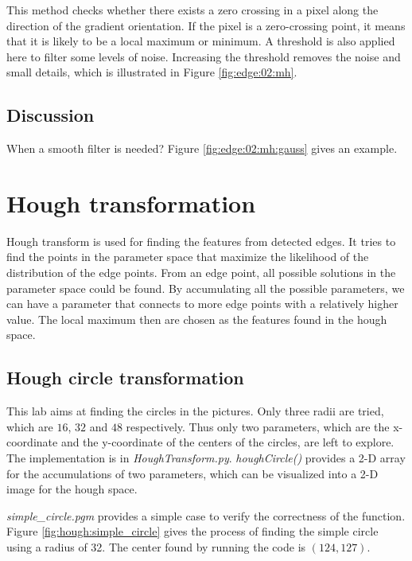 \documentclass[paper=a4, fontsize=11pt]{scrartcl}
\numberwithin{equation}{section}		%
\numberwithin{figure}{section}			%
\begin{document}
This method checks whether there exists a zero crossing in a pixel along the direction of the gradient orientation.
If the pixel is a zero-crossing point, it means that it is likely to be a local maximum or minimum. 
A threshold is also applied here to filter some levels of noise.
Increasing the threshold removes the noise and small details, which is illustrated in Figure \ref{fig:edge:02:mh}.

\subsection{Discussion}



When a smooth filter is needed?
Figure \ref{fig:edge:02:mh:gauss} gives an example.

\section{Hough transformation}

Hough transform is used for finding the features from detected edges.
It tries to find the points in the parameter space that maximize the likelihood of the distribution of the edge points.
From an edge point, all possible solutions in the parameter space could be found.
By accumulating all the possible parameters, we can have a parameter that connects to more edge points with a relatively higher value.
The local maximum then are chosen as the features found in the hough space.

\subsection{Hough circle transformation}

This lab aims at finding the circles in the pictures. 
Only three radii are tried, which are $ 16 $, $ 32 $ and $ 48 $ respectively.
Thus only two parameters, which are the x-coordinate and the y-coordinate of the centers of the circles, are left to explore.
The implementation is in \emph{HoughTransform.py}.
\emph{houghCircle()} provides a 2-D array for the accumulations of two parameters, which can be visualized into a 2-D image for the hough space.

\emph{simple\_circle.pgm} provides a simple case to verify the correctness of the function. 
Figure \ref{fig:hough:simple_circle} gives the process of finding the simple circle using a radius of 32.
The center found by running the code is $ (124, 127) $.
\end{document}
